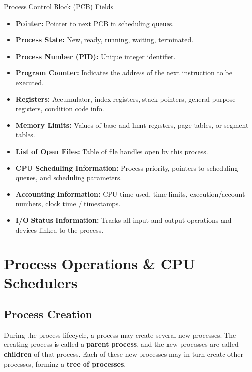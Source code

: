 \documentclass[10pt,a4paper]{article}
\begin{document}
\begin{darkcard}{Process Control Block (PCB) Fields}
\begin{itemize}
    \item \textbf{Pointer:} Pointer to next PCB in scheduling queues.
    \item \textbf{Process State:} New, ready, running, waiting, terminated.
    \item \textbf{Process Number (PID):} Unique integer identifier.
    \item \textbf{Program Counter:} Indicates the address of the next instruction to be executed.
    \item \textbf{Registers:} Accumulator, index registers, stack pointers, general purpose registers, condition code info.
    \item \textbf{Memory Limits:} Values of base and limit registers, page tables, or segment tables.
    \item \textbf{List of Open Files:} Table of file handles open by this process.
    \item \textbf{CPU Scheduling Information:} Process priority, pointers to scheduling queues, and scheduling parameters.
    \item \textbf{Accounting Information:} CPU time used, time limits, execution/account numbers, clock time / timestamps.
    \item \textbf{I/O Status Information:} Tracks all input and output operations and devices linked to the process.
\end{itemize}
\end{darkcard}

\clearpage
\section{Process Operations \& CPU Schedulers}

\subsection{Process Creation}
During the process lifecycle, a process may create several new processes. The creating process is called a \textbf{parent process}, and the new processes are called \textbf{children} of that process. Each of these new processes may in turn create other processes, forming a \textbf{tree of processes}.
\end{document}
